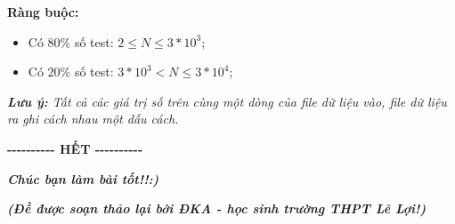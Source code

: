 \documentclass[
]{article}
\begin{document}
\textbf{Ràng buộc:}


\begin{itemize}
\item
  Có $80\%$ số test: $2 \leq N \leq 3*10^{3}$;
\item
  Có $20\%$ số test: $3*10^{3} < N \leq 3*10^{4}$;
\end{itemize}

\it{\textbf{Lưu ý:} Tất cả các giá trị số trên cùng một dòng của file
dữ liệu vào, file dữ liệu ra ghi cách nhau một dấu cách.}

\textbf{-\/-\/-\/-\/-\/-\/-\/-\/-\/- HẾT -\/-\/-\/-\/-\/-\/-\/-\/-\/-}

\it{\textbf{Chúc bạn làm bài tốt!!:)}}

\it{\textbf{(Đề được soạn thảo lại bởi ĐKA - học sinh trường THPT Lê
Lợi!)}}
\end{document}
